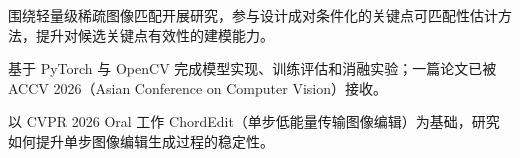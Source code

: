 
\begin{ResumeItemize}
  \item 围绕轻量级稀疏图像匹配开展研究，参与设计成对条件化的关键点可匹配性估计方法，提升对候选关键点有效性的建模能力。
  \item 基于 PyTorch 与 OpenCV 完成模型实现、训练评估和消融实验；一篇论文已被 ACCV 2026（Asian Conference on Computer Vision）接收。
\end{ResumeItemize}

\begin{ResumeItemize}
  \item 以 CVPR 2026 Oral 工作 ChordEdit（单步低能量传输图像编辑）为基础，研究如何提升单步图像编辑生成过程的稳定性。
\end{ResumeItemize}

